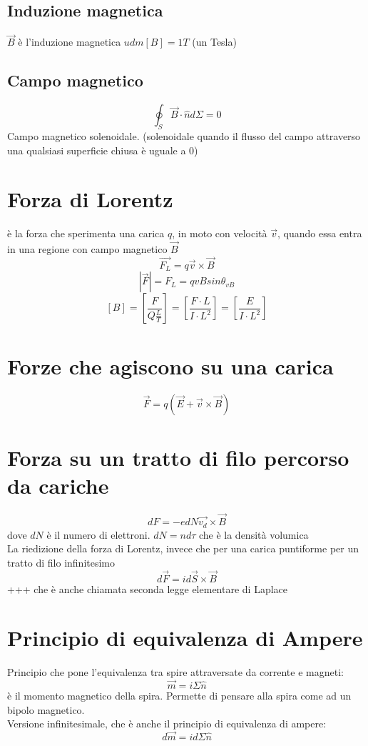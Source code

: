 \documentclass[a4paper]{report}
\begin{document}
  \subsection{Induzione magnetica}
  $\vec{B}$ è l'induzione magnetica $udm[B] = 1T$ (un Tesla)
  \subsection{Campo magnetico}
  $$ \oint_S \vec{B}\cdot \hat{n} d\Sigma = 0 $$
  Campo magnetico solenoidale. (solenoidale quando il flusso del campo attraverso una qualsiasi superficie chiusa è uguale a 0)

  \section{Forza di Lorentz}
  è la forza che sperimenta una carica $q$, in moto con velocità $\vec{v}$, quando essa entra in una regione con campo magnetico $\vec{B}$
  $$ \vec{F_L} = q\vec{v} \times \vec{B} $$
  $$ |\vec{F}| = F_L = qvB sin\theta_{vB} $$
  $$ [B] = [\frac{F}{Q\frac{L}{T}}] = [\frac{F\cdot L}{I\cdot L^2}] = [\frac{E}{I\cdot L^2}] $$

  \section{Forze che agiscono su una carica}
  $$ \vec{F} = q(\vec{E} + \vec{v} \times \vec{B}) $$

  \section{Forza su un tratto di filo percorso da cariche}
  $$ dF = -e dN \vec{v_d} \times \vec{B}$$
  dove $dN$ è il numero di elettroni. $dN = nd\tau$ che è la densità volumica\\
  La riedizione della forza di Lorentz, invece che per una carica puntiforme per un tratto di filo infinitesimo
  $$ d\vec{F} = i d\vec{S} \times \vec{B} $$+++
  che è anche chiamata seconda legge elementare di Laplace

  \section{Principio di equivalenza di Ampere}
  Principio che pone l'equivalenza tra spire attraversate da corrente e magneti:
  $$ \vec{m} = i \Sigma \hat{n} $$
  è il momento magnetico della spira. Permette di pensare alla spira come ad un bipolo magnetico.\\
  Versione infinitesimale, che è anche il principio di equivalenza di ampere:
  $$ d\vec{m} = id\Sigma \hat{n} $$
\end{document}
